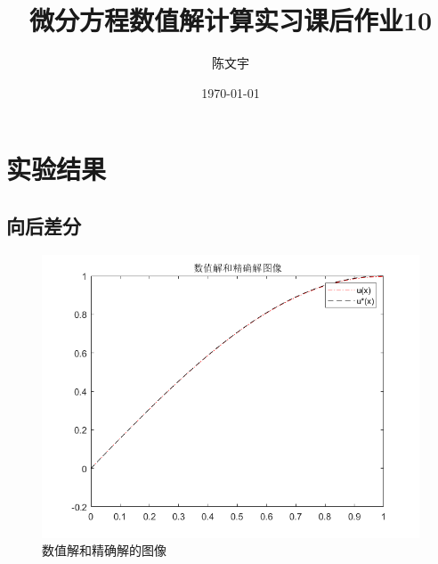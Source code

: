 \documentclass{article}
\title{微分方程数值解计算实习课后作业10}
\author{陈文宇}
\date{\today}
\begin{document}
\maketitle
\tableofcontents
\newpage
\section{实验结果}
\subsection{向后差分}

\begin{figure}[H]
\centering
\includegraphics[scale=0.45]{向后差分/solution_1.png}
\caption{\label{solution_image}数值解和精确解的图像}
\end{figure}
\end{document}
